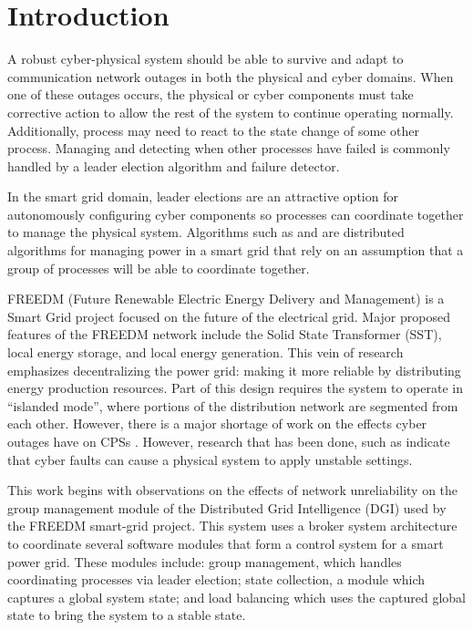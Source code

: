\chapter{Introduction}
A robust cyber-physical system should be able to survive and adapt to communication network outages in both the physical and cyber domains. When one of these outages occurs, the physical or cyber components must take corrective action to allow the rest of the system to continue operating normally. Additionally, process may need to react to the state change of some other process. Managing and detecting when other processes have failed is commonly handled by a leader election algorithm and failure detector.

In the smart grid domain, leader elections are an attractive option for autonomously configuring cyber components so processes can coordinate together to manage the physical system. Algorithms such as \cite{LOADBALANCING} and \cite{INCREMENTALCONSENSUS} are distributed algorithms for managing power in a smart grid that rely on an assumption that a group of processes will be able to coordinate together. 

FREEDM (Future Renewable Electric Energy Delivery and Management) is a Smart Grid project focused on the future of the electrical grid. Major proposed features of the FREEDM network include the Solid State Transformer (SST), local energy storage, and local energy generation\cite{FREEDMMIGRATION}. This vein of research emphasizes decentralizing the power grid: making it more reliable by distributing energy production resources. Part of this design requires the system to operate in “islanded mode”, where portions of the distribution network are segmented from each other. However, there is a major shortage of work on the effects cyber outages have on CPSs \cite{CYBERRESEARCHCALL} \cite{SMARTGRIDBENEFITS}. However, research that has been done, such as \cite{HARINI} indicate that cyber faults can cause a physical system to apply unstable settings.

This work begins with observations on the effects of network unreliability on the group management module of the Distributed Grid Intelligence (DGI) used by the FREEDM smart-grid project. This system uses a broker system architecture to coordinate several software modules that form a control system for a smart power grid. These modules include: group management, which handles coordinating processes via leader election; state collection, a module which captures a global system state; and load balancing which uses the captured global state to bring the system to a stable state.


